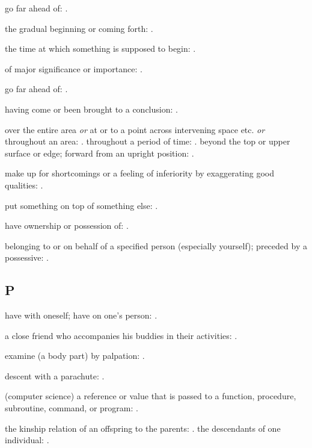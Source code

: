   go far ahead of: .

  the gradual beginning or coming forth: .

  the time at which something is supposed to begin: .

  of major significance or importance: .

  go far ahead of: .

  having come or been brought to a conclusion: .

  over the entire area \textit{or} at or to a point across intervening space etc. \textit{or} throughout an area: . throughout a period of time: . beyond the top or upper surface or edge; forward from an upright position: .

  make up for shortcomings or a feeling of inferiority by exaggerating good qualities: .

  put something on top of something else: .

  have ownership or possession of: .

  belonging to or on behalf of a specified person (especially yourself); preceded by a possessive: .

\subsection*{P}

  have with oneself; have on one's person: .

  a close friend who accompanies his buddies in their activities: .

  examine (a body part) by palpation: .

  descent with a parachute: .

  (computer science) a reference or value that is passed to a function, procedure, subroutine, command, or program: .

  the kinship relation of an offspring to the parents: . the descendants of one individual: .

